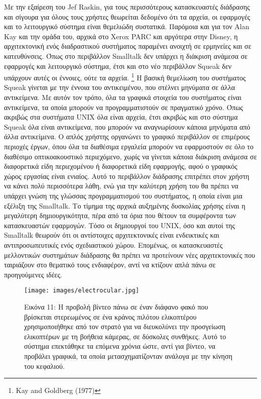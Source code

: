 \documentclass[
]{article}
\begin{document}
Με την εξαίρεση του Jef Raskin, για τους περισσότερους κατασκευαστές
διάδρασης και σίγουρα για όλους τους χρήστες θεωρείται δεδομένο ότι τα
αρχεία, οι εφαρμογές και το λειτουργικό σύστημα είναι θεμελιώδη
συστατικά. Παρόμοια και για τον Alan Kay και την ομάδα του, αρχικά στο
Xerox PARC και αργότερα στην Disney, η αρχιτεκτονική ενός διαδραστικού
συστήματος παραμένει ανοιχτή σε ερμηνείες και σε κατευθύνσεις. Όπως στο
περιβάλλον Smalltalk δεν υπάρχει η διάκριση ανάμεσα σε εφαρμογές και
λειτουργικό σύστημα, έτσι και στο νέο περιβάλλον Squeak δεν υπάρχουν
αυτές οι έννοιες, ούτε τα αρχεία. \footnote{Kay and Goldberg (1977)} Η
βασική θεμελίωση του συστήματος Squeak γίνεται με την έννοια του
αντικειμένου, που στέλνει μηνύματα σε άλλα αντικείμενα. Με αυτόν τον
τρόπο, όλα τα γραφικά στοιχεία του συστήματος είναι αντικείμενα, τα
οποία μπορούν να προγραμματιστούν σε πραγματικό χρόνο. Όπως ακριβώς στα
συστήματα UNIX όλα είναι αρχεία, έτσι ακριβώς και στο σύστημα Squeak όλα
είναι αντικείμενα, που μπορούν να αναγνωρίσουν κάποια μηνύματα από άλλα
αντικείμενα. Ο απλός χρήστης οργανώνει το γραφικό περιβάλλον σε
επιμέρους περιοχές έργων, όπου όλα τα διαθέσιμα εργαλεία μπορούν να
εφαρμοστούν σε όλο το διαθέσιμο οπτικοακουστικό περιεχόμενο, χωρίς να
γίνεται κάποια διάκριση ανάμεσα σε διαφορετικά είδη περιεχομένου ή
διαφορετικά είδη εφαρμογής, αφού ο γραφικός χώρος εργασίας είναι
ενιαίος. Αυτό το περιβάλλον διάδρασης επιτρέπει στον χρήστη να κάνει
πολύ περισσότερα λάθη, ενώ για την καλύτερη χρήση του θα πρέπει να
υπάρχει γνώση της γλώσσας προγραμματισμού του συστήματος, η οποία είναι
μια εξέλιξη της Smalltalk. Το τίμημα της αρχικά αυξημένης δυσκολίας
χρήσης είναι η μεγαλύτερη δημιουργικότητα, πέρα από τα όρια που θέτουν
τα συμφέροντα των κατασκευαστών εφαρμογών. Τόσο οι δημιουργοί του UNIX,
όσο και αυτοί της Smalltalk θεωρούν ότι οι αντίστοιχες αρχιτεκτονικές
είναι ενδεικτικές και αντιπροσωπευτικές ενός σχεδιαστικού χώρου.
Επομένως, οι κατασκευαστές μελλοντικών συστημάτων διάδρασης θα πρέπει να
προτείνουν νέες αρχιτεκτονικές που ταιριάζουν στο θεματικό τους
ενδιαφέρον, αντί να κτίζουν απλά πάνω σε προηγούμενες ιδέες.

\leavevmode{}%
\begin{figure}
\hypertarget{fig:electrocular}{%
\centering
\texttt{[image: images/electrocular.jpg]}
\caption{Εικόνα 11: Η προβολή βίντεο πάνω σε έναν διάφανο φακό που
βρίσκεται στερεωμένος σε ένα κράνος πιλότου ελικοπτέρου χρησιμοποιήθηκε
από τον στρατό για να διευκολύνει την προσγείωση ελικοπτέρων με τη
βοήθεια κάμερας, σε δύσκολες συνθήκες. Αυτό το σύστημα επεκτάθηκε τα
επόμενα χρόνια ώστε, αντί για βίντεο, να προβάλει γραφικά, τα οποία
μετασχηματίζονταν ανάλογα με την κίνηση του
κεφαλιού.}\label{fig:electrocular}
}
\end{figure}
\end{document}
